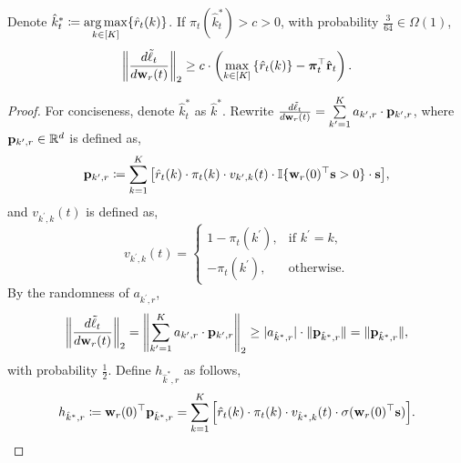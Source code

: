 \begin{lem}
\label{lem:gradient_lower_bound}
	Denote $\hat{k}_t^* \coloneqq \operatorname*{arg\,max}\limits_{k \in [K]}\{ \hat{r}_{t}(k) \}$. If $\pi_{t}(\hat{k}_t^*) > c > 0$, with probability $\frac{3}{64} \in \Omega\left( 1 \right)$,
\begin{equation*}
\begin{split}
	\left\| \frac{d\tilde{\ell}_t}{d {\mathbf{w}}_r(t)} \right\|_2 \ge c \cdot \left( \max\limits_{k \in \left[K\right]}\left\{ \hat{r}_{t}(k) \right\} - {\boldsymbol{\pi}}_t^\top \hat{{\mathbf{r}}}_t \right) .
\end{split}
\end{equation*}
\end{lem}
\begin{proof}
	 For conciseness, denote $\hat{k}_t^*$ as $\hat{k}^*$. Rewrite $\frac{d\tilde{\ell}_{t}}{d {\mathbf{w}}_r(t)} = \sum\limits_{k^
	\prime=1}^{K}{ a_{k^\prime,r} \cdot {\mathbf{p}}_{k^\prime, r} }$, where ${\mathbf{p}}_{k^\prime, r} \in {\mathbb{R}}^d$ is defined as, 
\begin{equation*}
	{\mathbf{p}}_{k^\prime, r} \coloneqq \sum\limits_{k=1}^{K}{ \left[ \hat{r}_{t}(k) \cdot \pi_{t}(k) \cdot v_{k^\prime,k}(t) \cdot {\mathbb{I}}\{ {\mathbf{w}}_r(0)^\top {\mathbf{s}} > 0 \} \cdot {\mathbf{s}} \right] },
\end{equation*}
and $v_{k^\prime,k}(t)$ is defined as,
\begin{equation*}
	v_{k^\prime,k}(t) = \begin{cases}
    1 - \pi_{t}(k^\prime), & \text{if $k^\prime = k$}, \\
    - \pi_{t}(k^\prime), & \text{otherwise}.
  \end{cases}
\end{equation*}
By the randomness of $a_{k^\prime,r}$,
\begin{equation}
\label{eq:gradient_p_lowerbound}
\begin{split}
	\left\| \frac{d\tilde{\ell}_t}{d {\mathbf{w}}_r(t)} \right\|_2 = \left\| \sum\limits_{k^
	\prime=1}^{K}{ a_{k^\prime,r} \cdot {\mathbf{p}}_{k^\prime, r} } \right\|_2 \ge | a_{\hat{k}^*,r} | \cdot \| {\mathbf{p}}_{\hat{k}^*, r}\| = \| {\mathbf{p}}_{\hat{k}^*, r}\|,
\end{split}
\end{equation}
with probability $\frac{1}{2}$. Define $h_{\hat{k}^*,r}$ as follows,
\begin{equation}
\label{eq:h_auxiliary}
\begin{split}
	h_{\hat{k}^*,r} \coloneqq \rvw_r(0)^\top \rvp_{\hat{k}^*, r} =  \sum\limits_{k=1}^{K}{ \left[ \hat{r}_{t}(k) \cdot \pi_{t}(k) \cdot v_{\hat{k}^*,k}(t) \cdot \sigma( \rvw_r(0)^\top \rvs ) \right] }.

\end{split}
\end{equation}
\end{proof}
